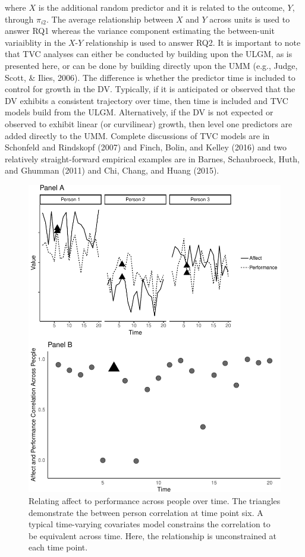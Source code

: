 \documentclass[english,,man]{apa6}
\begin{document}
\noindent \noindent where \(X\) is the additional random predictor and it is related to the outcome, \(Y\), through \(\pi_{i2}\). The average relationship between \(X\) and \(Y\) across units is used to answer RQ1 whereas the variance component estimating the between-unit variaiblity in the \(X\)-\(Y\) relationship is used to answer RQ2. It is important to note that TVC analyses can either be conducted by building upon the ULGM, as is presented here, or can be done by building directly upon the UMM (e.g., Judge, Scott, \& Ilies, 2006). The difference is whether the predictor time is included to control for growth in the DV. Typically, if it is anticipated or observed that the DV exhibits a consistent trajectory over time, then time is included and TVC models build from the ULGM. Alternatively, if the DV is not expected or observed to exhibit linear (or curvilinear) growth, then level one predictors are added directly to the UMM. Complete discussions of TVC models are in Schonfeld and Rindskopf (2007) and Finch, Bolin, and Kelley (2016) and two relatively straight-forward empirical examples are in Barnes, Schaubroeck, Huth, and Ghumman (2011) and Chi, Chang, and Huang (2015).

\begin{figure}
\centering
\includegraphics{figures/unnamed-chunk-15-1.pdf}
\caption{\label{fig:unnamed-chunk-15}Relating affect to performance across people over time. The triangles demonstrate the between person correlation at time point six. A typical time-varying covariates model constrains the correlation to be equivalent across time. Here, the relationship is unconstrained at each time point.\label{relation_tvc}}
\end{figure}
\end{document}
